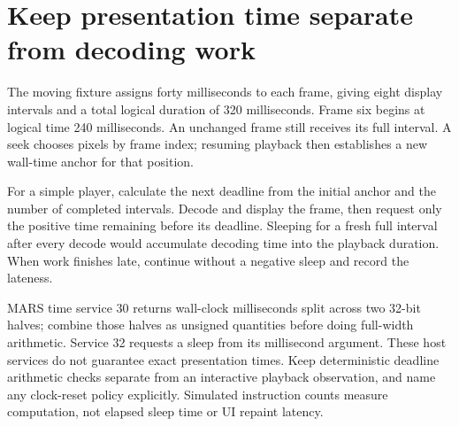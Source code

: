 \section{Keep presentation time separate from decoding work}
The moving fixture assigns forty milliseconds to each frame, giving eight display
intervals and a total logical duration of 320 milliseconds. Frame six begins at
logical time 240 milliseconds. An unchanged frame still receives its full interval.
A seek chooses pixels by frame index; resuming playback then establishes a new wall-time
anchor for that position.

For a simple player, calculate the next deadline from the initial anchor and the
number of completed intervals. Decode and display the frame, then request only the
positive time remaining before its deadline. Sleeping for a fresh full interval
after every decode would accumulate decoding time into the playback duration. When
work finishes late, continue without a negative sleep and record the lateness.

MARS time service 30 returns wall-clock milliseconds split across two 32-bit halves;
combine those halves as unsigned quantities before doing full-width arithmetic.
Service 32 requests a sleep from its millisecond argument. These host services do
not guarantee exact presentation times. Keep deterministic deadline arithmetic
checks separate from an interactive playback observation, and name any clock-reset
policy explicitly. Simulated instruction counts measure computation, not elapsed
sleep time or UI repaint latency.
